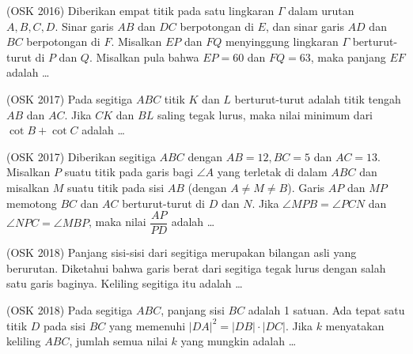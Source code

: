 \documentclass[11pt]{scrartcl}
\begin{document}
	\begin{soalbaru}(OSK 2016)
	Diberikan empat titik pada satu lingkaran $\Gamma$ dalam urutan $A, B, C, D$. Sinar garis $AB$ dan
$DC$ berpotongan di $E$, dan sinar garis $AD$ dan $BC$ berpotongan di $F$. Misalkan $EP$ dan
$FQ$ menyinggung lingkaran $\Gamma$ berturut-turut di $P$ dan $Q$. Misalkan pula bahwa $EP = 60$
dan $FQ = 63$, maka panjang $EF$ adalah \dots
	\end{soalbaru}
	
	\begin{soalbaru}
	(OSK 2017) Pada segitiga $ABC$ titik $K$ dan $L$ berturut-turut adalah titik tengah $AB$ dan $AC$. Jika $CK$ dan $BL$
saling tegak lurus, maka nilai minimum dari $\cot B + \cot C$ adalah \dots
	\end{soalbaru}
	
	\begin{soalbaru}
	(OSK 2017) Diberikan segitiga $ABC$ dengan $AB = 12, BC = 5$ dan $AC = 13$. Misalkan $P$ suatu titik pada garis
bagi $\angle A$ yang terletak di dalam $ABC$ dan misalkan $M$ suatu titik pada sisi $AB$ (dengan $A\neq  M \neq
B$). Garis $AP$ dan $MP$ memotong $BC$ dan $AC$ berturut-turut di $D$ dan $N$. Jika $\angle MPB = \angle PCN$
dan $\angle NPC = \angle MBP$, maka nilai $\dfrac{AP}{PD}$
adalah \dots
	\end{soalbaru}
	
	\begin{soalbaru}
	(OSK 2018)
	Panjang sisi-sisi dari segitiga merupakan bilangan asli yang berurutan. Diketahui bahwa garis berat dari
segitiga tegak lurus dengan salah satu garis baginya. Keliling segitiga itu adalah \dots
	\end{soalbaru}
	
	\begin{soalbaru}
	(OSK 2018) Pada segitiga $ABC$, panjang sisi $BC$ adalah 1 satuan. Ada tepat satu titik $D$ pada sisi $BC$ yang memenuhi
$|DA|^2 = |DB| \cdot |DC|$. Jika $k$ menyatakan keliling $ABC$, jumlah semua nilai $k$ yang mungkin adalah \dots
	\end{soalbaru}
	
\end{document}
